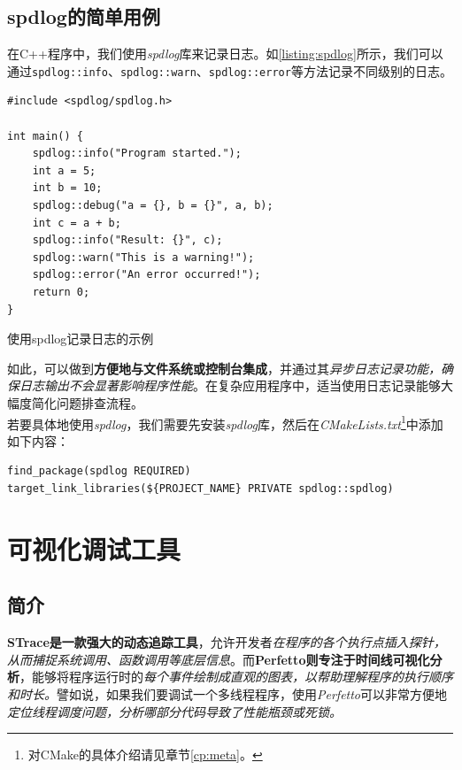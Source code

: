 \subsection{spdlog的简单用例}

在C++程序中，我们使用\textit{spdlog}库来记录日志。如\ref{listing:spdlog}所示，我们可以通过\texttt{spdlog::info}、\texttt{spdlog::warn}、\texttt{spdlog::error}等方法记录不同级别的日志。\\

\begin{longlisting}
    \begin{verbatim}
#include <spdlog/spdlog.h>

int main() {
    spdlog::info("Program started.");
    int a = 5;
    int b = 10;
    spdlog::debug("a = {}, b = {}", a, b);
    int c = a + b;
    spdlog::info("Result: {}", c);
    spdlog::warn("This is a warning!");
    spdlog::error("An error occurred!");
    return 0;
}
    \end{verbatim}
    \caption{使用spdlog记录日志的示例}
    \label{listing:spdlog}
\end{longlisting}

如此，可以做到\textbf{方便地与文件系统或控制台集成}，并通过其\textit{异步日志记录功能，确保日志输出不会显著影响程序性能}。在复杂应用程序中，适当使用日志记录能够大幅度简化问题排查流程。\\

若要具体地使用\textit{spdlog}，我们需要先安装\textit{spdlog}库，然后在\textit{CMakeLists.txt}\footnote{对CMake的具体介绍请见章节\ref{cp:meta}。}中添加如下内容：

\begin{longlisting}
    \begin{verbatim}
find_package(spdlog REQUIRED)
target_link_libraries(${PROJECT_NAME} PRIVATE spdlog::spdlog)
    \end{verbatim}
    \label{listing:spdlog-cmake}
\end{longlisting}

\section{可视化调试工具}

\subsection{简介}

\textbf{STrace是一款强大的动态追踪工具}，允许开发者\textit{在程序的各个执行点插入探针，从而捕捉系统调用、函数调用等底层信息}。而\textbf{Perfetto则专注于时间线可视化分析}，能够将程序运行时的\textit{每个事件绘制成直观的图表，以帮助理解程序的执行顺序和时长。}譬如说，如果我们要调试一个多线程程序，使用\textit{Perfetto}可以非常方便地\textit{定位线程调度问题，分析哪部分代码导致了性能瓶颈或死锁。}

